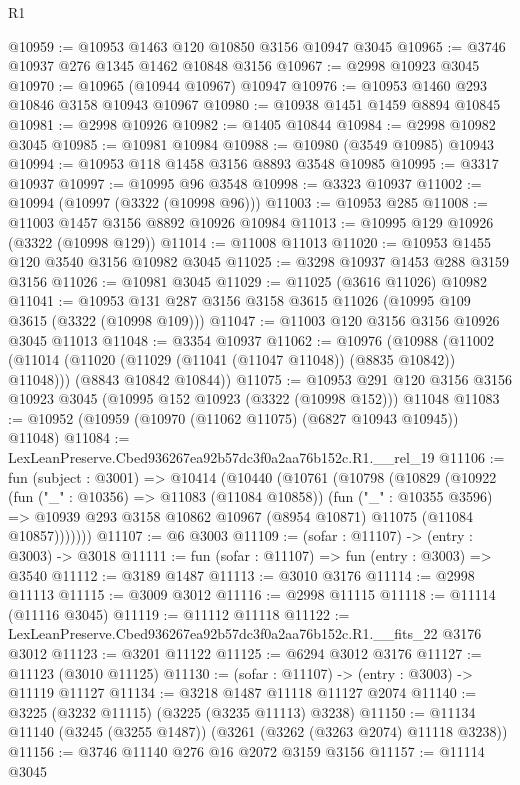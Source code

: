 \begin{lexlean}{R1}
\begin{coremodule}
@10959 := @10953 @1463 @120 @10850 @3156 @10947 @3045
@10965 := @3746 @10937 @276 @1345 @1462 @10848 @3156
@10967 := @2998 @10923 @3045
@10970 := @10965 (@10944 @10967) @10947
@10976 := @10953 @1460 @293 @10846 @3158 @10943 @10967
@10980 := @10938 @1451 @1459 @8894 @10845
@10981 := @2998 @10926
@10982 := @1405 @10844
@10984 := @2998 @10982 @3045
@10985 := @10981 @10984
@10988 := @10980 (@3549 @10985) @10943
@10994 := @10953 @118 @1458 @3156 @8893 @3548 @10985
@10995 := @3317 @10937
@10997 := @10995 @96 @3548
@10998 := @3323 @10937
@11002 := @10994 (@10997 (@3322 (@10998 @96)))
@11003 := @10953 @285
@11008 := @11003 @1457 @3156 @8892 @10926 @10984
@11013 := @10995 @129 @10926 (@3322 (@10998 @129))
@11014 := @11008 @11013
@11020 := @10953 @1455 @120 @3540 @3156 @10982 @3045
@11025 := @3298 @10937 @1453 @288 @3159 @3156
@11026 := @10981 @3045
@11029 := @11025 (@3616 @11026) @10982
@11041 := @10953 @131 @287 @3156 @3158 @3615 @11026 (@10995 @109 @3615 (@3322 (@10998 @109)))
@11047 := @11003 @120 @3156 @3156 @10926 @3045 @11013
@11048 := @3354 @10937
@11062 := @10976
    (@10988
      (@11002 (@11014 (@11020 (@11029 (@11041 (@11047 @11048)) (@8835 @10842)) @11048)))
      (@8843 @10842 @10844))
@11075 := @10953
    @291
    @120
    @3156
    @3156
    @10923
    @3045
    (@10995 @152 @10923 (@3322 (@10998 @152)))
    @11048
@11083 := @10952 (@10959 (@10970 (@11062 @11075) (@6827 @10943 @10945)) @11048)
@11084 := LexLeanPreserve.Cbed936267ea92b57dc3f0a2aa76b152c.R1.__rel_19
@11106 := fun (subject : @3001) =>
  @10414
    (@10440
      (@10761
        (@10798
          (@10829
            (@10922
              (fun ("_" : @10356) => @11083 (@11084 @10858))
              (fun ("_" : @10355 @3596) =>
              @10939 @293 @3158 @10862 @10967 (@8954 @10871) @11075 (@11084 @10857)))))))
@11107 := @6 @3003
@11109 := (sofar : @11107) -> (entry : @3003) -> @3018
@11111 := fun (sofar : @11107) => fun (entry : @3003) => @3540
@11112 := @3189 @1487
@11113 := @3010 @3176
@11114 := @2998 @11113
@11115 := @3009 @3012
@11116 := @2998 @11115
@11118 := @11114 (@11116 @3045)
@11119 := @11112 @11118
@11122 := LexLeanPreserve.Cbed936267ea92b57dc3f0a2aa76b152c.R1.__fits_22 @3176 @3012
@11123 := @3201 @11122
@11125 := @6294 @3012 @3176
@11127 := @11123 (@3010 @11125)
@11130 := (sofar : @11107) -> (entry : @3003) -> @11119 @11127
@11134 := @3218 @1487 @11118 @11127 @2074
@11140 := @3225 (@3232 @11115) (@3225 (@3235 @11113) @3238)
@11150 := @11134 @11140 (@3245 (@3255 @1487)) (@3261 (@3262 (@3263 @2074) @11118 @3238))
@11156 := @3746 @11140 @276 @16 @2072 @3159 @3156
@11157 := @11114 @3045

\end{coremodule}
\end{lexlean}

